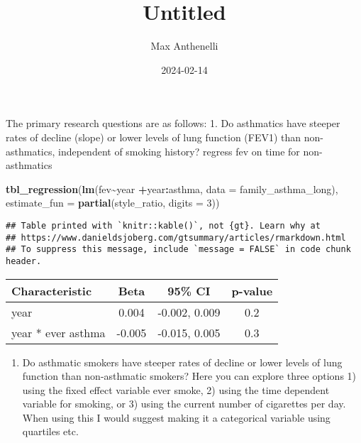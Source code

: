 \documentclass[
]{article}
\title{Untitled}
\author{Max Anthenelli}
\date{2024-02-14}
\newenvironment{Shaded}{\begin{snugshade}}{\end{snugshade}}
\newcommand{\AttributeTok}[1]{\textcolor[rgb]{0.13,0.29,0.53}{#1}}
\newcommand{\DecValTok}[1]{\textcolor[rgb]{0.00,0.00,0.81}{#1}}
\newcommand{\FunctionTok}[1]{\textcolor[rgb]{0.13,0.29,0.53}{\textbf{#1}}}
\newcommand{\NormalTok}[1]{#1}
\newcommand{\SpecialCharTok}[1]{\textcolor[rgb]{0.81,0.36,0.00}{\textbf{#1}}}
\providecommand{\tightlist}{%
  \setlength{\itemsep}{0pt}\setlength{\parskip}{0pt}}
\begin{document}
\maketitle

The primary research questions are as follows: 1. Do asthmatics have
steeper rates of decline (slope) or lower levels of lung function (FEV1)
than non-asthmatics, independent of smoking history? regress fev on time
for non-asthmatics

\begin{Shaded}
\begin{Highlighting}[]
\FunctionTok{tbl\_regression}\NormalTok{(}\FunctionTok{lm}\NormalTok{(fev}\SpecialCharTok{\textasciitilde{}}\NormalTok{year }\SpecialCharTok{+}\NormalTok{year}\SpecialCharTok{:}\NormalTok{asthma, }\AttributeTok{data =}\NormalTok{ family\_asthma\_long), }\AttributeTok{estimate\_fun =} \FunctionTok{partial}\NormalTok{(style\_ratio, }\AttributeTok{digits =} \DecValTok{3}\NormalTok{))}
\end{Highlighting}
\end{Shaded}

\begin{verbatim}
## Table printed with `knitr::kable()`, not {gt}. Learn why at
## https://www.danieldsjoberg.com/gtsummary/articles/rmarkdown.html
## To suppress this message, include `message = FALSE` in code chunk header.
\end{verbatim}

\begin{longtable}[]{@{}lccc@{}}
\toprule\noalign{}
\textbf{Characteristic} & \textbf{Beta} & \textbf{95\% CI} &
\textbf{p-value} \\
\midrule\noalign{}
\endhead
\bottomrule\noalign{}
\endlastfoot
year & 0.004 & -0.002, 0.009 & 0.2 \\
year * ever asthma & -0.005 & -0.015, 0.005 & 0.3 \\
\end{longtable}

\begin{enumerate}
\def\labelenumi{\arabic{enumi}.}
\setcounter{enumi}{1}
\tightlist
\item
  Do asthmatic smokers have steeper rates of decline or lower levels of
  lung function than non-asthmatic smokers? Here you can explore three
  options 1) using the fixed effect variable ever smoke, 2) using the
  time dependent variable for smoking, or 3) using the current number of
  cigarettes per day. When using this I would suggest making it a
  categorical variable using quartiles etc.
\end{enumerate}
\end{document}
